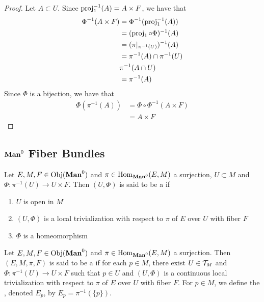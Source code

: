 \documentclass{book}
\begin{document}
	\begin{proof}
		Let $A \subset U$. Since $\operatorname{\text{proj}}_1^{-1}(A) = A \times F$, we have that 
		\begin{align*}
			\Phi^{-1}(A \times F)
			& = \Phi^{-1}(\operatorname{\text{proj}}_1^{-1}(A)) \\
			& = (\operatorname{\text{proj}}_1 \circ \Phi)^{-1}(A) \\
			& = (\pi|_{\pi^{-1}(U)})^{-1}(A) \\
			& = \pi^{-1}(A) \cap \pi^{-1}(U) \\
			&  \pi^{-1}(A \cap U) \\
			& = \pi^{-1}(A)
		\end{align*}
		Since $\Phi$ is a bijection, we have that
		\begin{align*}
			\Phi (\pi^{-1}(A))
			&= \Phi \circ \Phi^{-1}(A \times F) \\
			&= A \times F
		\end{align*}
	\end{proof}














	
	\subsection{$\Man0$ Fiber Bundles}
	
	\begin{defn} 
		Let $E, M, F \in \Obj(\Man0)$ and $\pi \in \Hom_{\Man0}(E, M)$ a surjection, $U \subset M$ and $\Phi: \pi^{-1}(U) \rightarrow U \times F$. Then $(U, \Phi)$ is said to be a   if 
		\begin{enumerate}
			\item $U$ is open in $M$
			\item $(U, \Phi)$ is a local trivialization with respect to $\pi$ of $E$ over $U$ with fiber $F$
			\item $\Phi$ is a homeomorphism
		\end{enumerate}
	\end{defn}
 
	\begin{defn} 
		Let $E,M, F \in \Obj(\Man0)$ and $\pi \in \Hom_{\Man0}(E, M)$ a surjection. Then $(E, M, \pi, F)$ is said to be a  if for each $p \in M$, there exist $U \in \mathcal{T}_M$ and $\Phi: \pi^{-1}(U) \rightarrow U \times F$ such that $p \in U$ and $(U, \Phi)$ is a continuous local trivialization with respect to $\pi$ of $E$ over $U$ with fiber $F$. For $p \in M$, we define the , denoted $E_p$, by $E_p = \pi^{-1}(\{p\})$.
	\end{defn}
\end{document}
